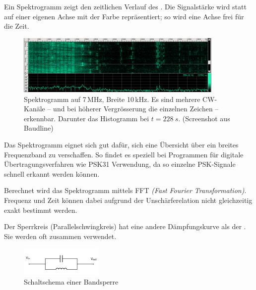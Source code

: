 {Ein Spektrogramm zeigt den zeitlichen Verlauf des . Die Signalstärke wird statt auf einer eigenen Achse mit der Farbe repräsentiert; so wird eine Achse frei für die Zeit.

\begin{figure}[h!]
 \centering
 \includegraphics[width=10cm]{./png/baudline-Spectro-Histo.png}
 \caption{Spektrogramm auf 7\,MHz, Breite 10\,kHz. Es sind mehrere CW-Kanäle -- und bei höherer Vergrösserung die einzelnen Zeichen -- erkennbar. Darunter das Histogramm bei $t=228~s$. (Screenshot aus Baudline)}
 \label{fig:baudline}
\end{figure}

Das Spektrogramm eignet sich gut dafür, sich eine Übersicht über ein breites Frequenzband zu verschaffen. So findet es speziell bei Programmen für digitale Übertragungsverfahren wie PSK31 Verwendung, da so einzelne PSK-Signale schnell erkannt werden können.

Berechnet wird das Spektrogramm mittels FFT \textit{(Fast Fourier Transformation)}. Frequenz und Zeit können dabei aufgrund der Unschärferelation nicht gleichzeitig exakt bestimmt werden.}

{Der Sperrkreis (Parallelschwingkreis) hat eine andere Dämpfungskurve als der . Sie werden oft zusammen verwendet.

\begin{figure}[h!]
 \centering
 \includegraphics[width=4cm]{./png/Amfu-Schema_Sperrkreis.png}
 \caption{Schaltschema einer Bandsperre}
 \label{fig:sperrkreis}
\end{figure}

}

